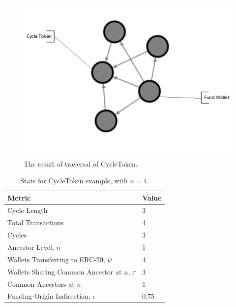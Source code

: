 \documentclass[conference]{IEEEtran}
\begin{document}

\begin{figure}
    \centering
    \includegraphics[width=0.5\columnwidth]{images/toy_graph.png}
    \caption{The result of traversal of CycleToken.}
    \label{fig:toygraph}
\end{figure}

\begin{table}[]
    \centering
\begin{tabular}{|l|l|}
\hline
\textbf{Metric}                & \textbf{Value} \\ \hline
Cycle Length             & 3              \\ \hline
Total Transactions             & 4              \\ \hline
Cycles            & 3              \\ \hline
Ancestor Level, $n$            & 1           \\ \hline
Wallets Transferring to ERC-20, $\psi$ & 4              \\ \hline
Wallets Sharing Common Ancestor at $n$, $\tau$            & 3           \\ \hline
Common Ancestors at $n$            & 1           \\ \hline
Funding-Origin Indirection, $\iota$            & 0.75           \\ \hline
\end{tabular}
    \caption{Stats for CycleToken example, with $n=1$.}
    \label{tab:toystats}
\end{table}
\end{document}
